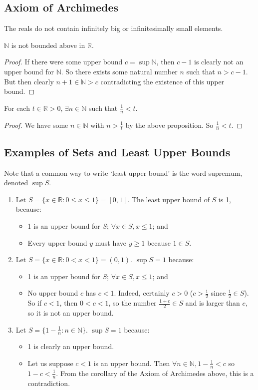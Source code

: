 \documentclass{article}
\begin{document}
	\subsection{Axiom of Archimedes}
	The reals do not contain infinitely big or infinitesimally small elements.
	\begin{proposition}
		$\mathbb N$ is not bounded above in $\mathbb R$.
	\end{proposition}
	\begin{proof}
		If there were some upper bound $c = \sup \mathbb N$, then $c-1$ is clearly not an upper bound for $\mathbb N$. So there exists some natural number $n$ such that $n > c-1$. But then clearly $n+1 \in \mathbb N > c$ contradicting the existence of this upper bound.
	\end{proof}
	\begin{corollary}
		For each $t \in \mathbb R > 0$, $\exists n \in \mathbb N$ such that $\frac{1}{n} < t$.
	\end{corollary}
	\begin{proof}
		We have some $n \in \mathbb N$ with $n > \frac{1}{t}$ by the above proposition. So $\frac{1}{n} < t$.
	\end{proof}

	\subsection{Examples of Sets and Least Upper Bounds}
	Note that a common way to write `least upper bound' is the word supremum, denoted $\sup S$.
	\begin{enumerate}
		\item Let $S = \{ x \in \mathbb R: 0 \leq x \leq 1 \} = [0, 1]$. The least upper bound of $S$ is 1, because:
		\begin{itemize}
			\item 1 is an upper bound for $S$; $\forall x \in S, x\leq1 $; and
			\item Every upper bound $y$ must have $y \geq 1$ because $1 \in S$.
		\end{itemize}
		\item Let $S = \{ x \in \mathbb R: 0 < x < 1 \} = (0, 1)$. $\sup S = 1$ because:
		\begin{itemize}
			\item 1 is an upper bound for $S$; $\forall x \in S, x \leq 1$; and
			\item No upper bound $c$ has $c<1$. Indeed, certainly $c>0$ ($c > \frac{1}{2}$ since $\frac{1}{2} \in S$). So if $c<1$, then $0<c<1$, so the number $\frac{1+c}{2} \in S$ and is larger than $c$, so it is not an upper bound.
		\end{itemize}
		\item Let $S = \{ 1 - \frac{1}{n}: n \in \mathbb N \}$. $\sup S = 1$ because:
		\begin{itemize}
			\item 1 is clearly an upper bound.
			\item Let us suppose $c < 1$ is an upper bound. Then $\forall n \in \mathbb N, 1 - \frac{1}{n} < c$ so $1 - c < \frac{1}{n}$. From the corollary of the Axiom of Archimedes above, this is a contradiction.
		\end{itemize}
	\end{enumerate}
\end{document}
